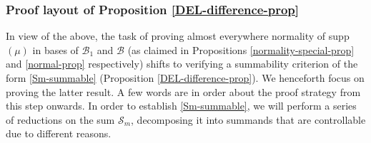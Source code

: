 \documentclass[12pt, twoside]{article}
\theoremstyle{definition}
\numberwithin{equation}{section}
\begin{document}
\subsubsection{Proof layout of Proposition \ref{DEL-difference-prop}} In view of the above, the task of proving almost everywhere normality of supp$(\mu)$ in bases of $\mathscr{B}_1$ and $\mathscr{B}$ (as claimed in Propositions \ref{normality-special-prop} and \ref{normal-prop} respectively) shifts to verifying a summability criterion of the form \eqref{Sm-summable} (Proposition \ref{DEL-difference-prop}). We henceforth focus on proving the latter result. A few words are in order about the proof strategy from this step onwards. In order to establish \eqref{Sm-summable},    
we will perform a series of reductions on the sum $\mathcal S_m$, decomposing it into summands that are controllable due to different reasons. 
\end{document}
